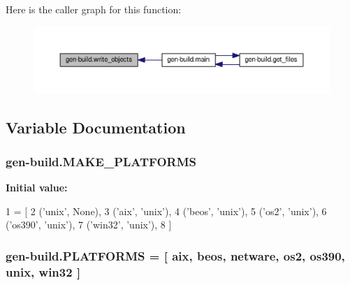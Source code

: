 Here is the caller graph for this function\+:
\nopagebreak
\begin{figure}[H]
\begin{center}
\leavevmode
\includegraphics[width=350pt]{namespacegen-build_a72863c184bb8734b32f7480d89f664ce_icgraph}
\end{center}
\end{figure}




\subsection{Variable Documentation}
\subsubsection[{\texorpdfstring{M\+A\+K\+E\+\_\+\+P\+L\+A\+T\+F\+O\+R\+MS}{MAKE_PLATFORMS}}]{ {\bf gen}-\/build.\+M\+A\+K\+E\+\_\+\+P\+L\+A\+T\+F\+O\+R\+MS}\hypertarget{namespacegen-build_a5f35a11490cb7a34729806229e259267}{}\label{namespacegen-build_a5f35a11490cb7a34729806229e259267}
{\bfseries Initial value\+:}
\begin{DoxyCode}
1 = [
2   (\textcolor{stringliteral}{'unix'}, \textcolor{keywordtype}{None}),
3   (\textcolor{stringliteral}{'aix'}, \textcolor{stringliteral}{'unix'}),
4   (\textcolor{stringliteral}{'beos'}, \textcolor{stringliteral}{'unix'}),
5   (\textcolor{stringliteral}{'os2'}, \textcolor{stringliteral}{'unix'}),
6   (\textcolor{stringliteral}{'os390'}, \textcolor{stringliteral}{'unix'}),
7   (\textcolor{stringliteral}{'win32'}, \textcolor{stringliteral}{'unix'}),
8   ]
\end{DoxyCode}
\subsubsection[{\texorpdfstring{P\+L\+A\+T\+F\+O\+R\+MS}{PLATFORMS}}]{ {\bf gen}-\/build.\+P\+L\+A\+T\+F\+O\+R\+MS = \mbox{[} \textquotesingle{}aix\textquotesingle{}, \textquotesingle{}beos\textquotesingle{}, \textquotesingle{}netware\textquotesingle{}, \textquotesingle{}os2\textquotesingle{}, \textquotesingle{}os390\textquotesingle{}, \textquotesingle{}unix\textquotesingle{}, \textquotesingle{}win32\textquotesingle{} \mbox{]}}\hypertarget{namespacegen-build_a6482e6bb2675ffd159f402ddc5582e9e}{}\label{namespacegen-build_a6482e6bb2675ffd159f402ddc5582e9e}
